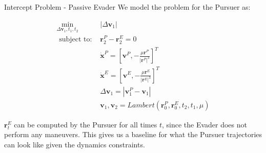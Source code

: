 \begin{frame}{Intercept Problem - Passive Evader}
    We model the problem for the Pursuer as:
                                        
    \begin{align}
        \min_{\Delta \boldsymbol{v}_1, t_1, t_2} \;      & |\Delta \boldsymbol{v}_1| \\ 
        \text{ subject to: }             & \boldsymbol{r}^P_2 - \boldsymbol{r}^E_2 = 0 \\
                                        & \dot{\boldsymbol{x}}^P = [\boldsymbol{v}^P, -\frac{\mu \boldsymbol{r}^P}{|\boldsymbol{r}^P|^3}]^T\\
                                        & \dot{\boldsymbol{x}}^E = [\boldsymbol{v}^E, -\frac{\mu \boldsymbol{r}^E}{|\boldsymbol{r}^E|^3}]^T\\
                                        & \Delta \boldsymbol{v}_1 = |\boldsymbol{v}^P_1 - \boldsymbol{v}_1| \\
                                        & \boldsymbol{v}_1, \boldsymbol{v}_2 = Lambert(\boldsymbol{r}^P_0, \boldsymbol{r}^E_0, t_2, t_1, \mu)
    \end{align} 

    $\boldsymbol{r}^E_t$ can be computed by the Pursuer for all times $t$, since the Evader does not perform any maneuvers. This gives us a baseline for what the Pursuer trajectories can look like given the dynamics constraints.
    
\end{frame}

